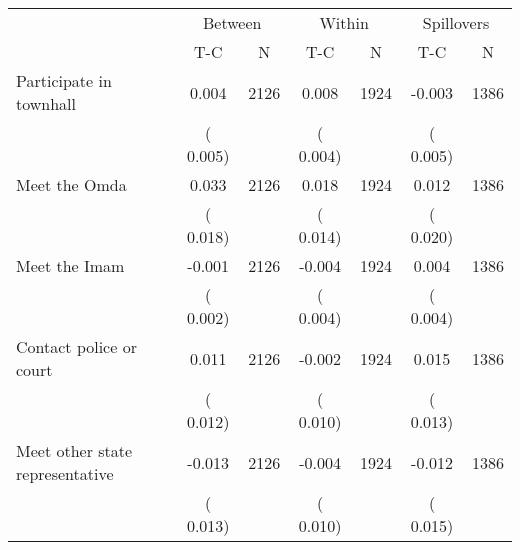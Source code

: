 
\begin{tabular}{l*{6}{c}}\hline&\multicolumn{2}{c}{Between}&\multicolumn{2}{c}{Within}&\multicolumn{2}{c}{Spillovers} \\ \cmidrule(r){2-3}\cmidrule(l){4-5}\cmidrule(l){6-7} & {T-C} & {N} & {T-C} & {N}  & {T-C}  & {N}  \\ \midrule
Participate in townhall        &              0.004      &       2126       &              0.008      &       1924       &             -0.003      &       1386       \\
                       &       (       0.005)            &                               &       (       0.004)            &                               &       (       0.005)            &                               \\
Meet the Omda        &              0.033      &       2126       &              0.018      &       1924       &              0.012      &       1386       \\
                       &       (       0.018)            &                               &       (       0.014)            &                               &       (       0.020)            &                               \\
Meet the Imam        &             -0.001      &       2126       &             -0.004      &       1924       &              0.004      &       1386       \\
                       &       (       0.002)            &                               &       (       0.004)            &                               &       (       0.004)            &                               \\
Contact police or court        &              0.011      &       2126       &             -0.002      &       1924       &              0.015      &       1386       \\
                       &       (       0.012)            &                               &       (       0.010)            &                               &       (       0.013)            &                               \\
Meet other state representative        &             -0.013      &       2126       &             -0.004      &       1924       &             -0.012      &       1386       \\
                       &       (       0.013)            &                               &       (       0.010)            &                               &       (       0.015)            &                               \\

\end{tabular}
